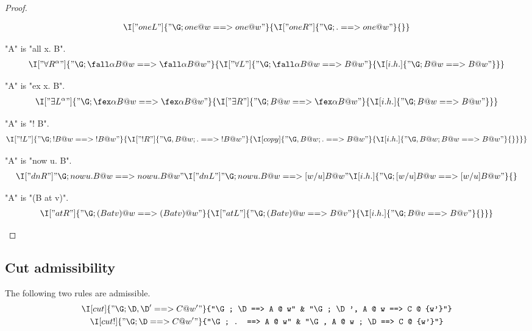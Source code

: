\documentclass{article}
\begin{document}
\begin{proof}
\begin{ecom} 
    \begin{gather*}
      \I["one L"]{"\G ; one @ w ==> one @ w"}
        {\I["one R"]{"\G ; . ==> one @ w"}{}}
    \end{gather*}
  \item "A" is "all x. B".
    \begin{gather*}
      \I["\forall R^\alpha"]{"\G ; \fall \alpha B @ w ==> \fall \alpha B @ w"}
        {\I["\forall L"]{"\G ; \fall \alpha B @ w ==> B @ w"}
           {\I[i.h.]{"\G ; B @ w ==> B @ w"}}
        }
    \end{gather*}
  \item "A" is "ex x. B".
    \begin{gather*}
      \I["\exists L^\alpha"]{"\G ; \fex \alpha B @ w ==> \fex \alpha B @ w"}
        {\I["\exists R"]{"\G ; B @ w ==> \fex \alpha B @ w"}
           {\I[i.h.]{"\G ; B @ w ==> B @ w"}}
        }
    \end{gather*}
  \item "A" is "! B".
    \begin{gather*}
      \I["!L"]{"\G ; {! B} @ w ==> {! B} @ w"}
        {\I["!R"]{"\G, B @ w ; . ==> {! B} @ w"}
           {\I[copy]{"\G, B @ w ; . ==> B @ w"}
              {\I[i.h.]{"\G, B @ w ; B @ w ==> B @ w"}{}}
           }
        }
    \end{gather*}
  \item "A" is "now u. B".
    \begin{gather*}
      \I["{dn} R"]{"\G ; now u. B @ w ==> now u. B @ w"}
        {\I["{dn} L"]{"\G ; now u. B @ w ==> [w/u] B @ w"}
           {\I[i.h.]{"\G ; [w/u] B @ w ==> [w/u] B @ w"}{}}
        }
    \end{gather*}
  \item "A" is "(B at v)".
    \begin{gather*}
      \I["at R"]{"\G ; (B at v) @ w ==> (B at v) @ w"}
        {\I["at L"]{"\G ; (B at v) @ w ==> B @ v"}
           {\I[i.h.]{"\G ; B @ v ==> B @ v"}{}}}
    \end{gather*}
  \end{ecom}
\end{proof}

\subsection{Cut admissibility}
\label{sec:proofs.cut}

\begin{thm} The following two rules are admissible.
  \begin{gather*}
    \I[cut]{"\G ; \D, \D' ==> C @ {w'}"}
      {"\G ; \D ==> A @ w" & "\G ; \D', A @ w ==> C @ {w'}"}
    \\
    \I[cut!]{"\G ; \D ==> C @ {w'}"}
      {"\G ; . ==> A @ w" & "\G, A @ w ; \D ==> C @ {w'}"}
  \end{gather*}
\end{thm}
\end{document}
